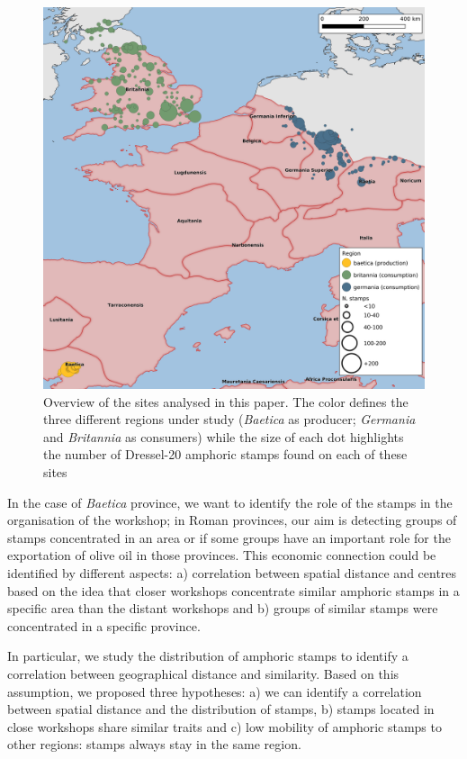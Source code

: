 \documentclass[review]{elsarticle}
\begin{document}
\begin{figure}[htp]
	\centering
\includegraphics[width=\linewidth]{figs/general_map}
\caption{Overview of the sites analysed in this paper. The color defines the three different regions under study (\textit{Baetica} as producer; \textit{Germania} and \textit{Britannia} as consumers) while the size of each dot highlights the number of Dressel-20 amphoric stamps found on each of these sites}

\label{general}
\end{figure} 
        
In the case of \textit{Baetica} province, we want to identify the role of the stamps in the organisation of the workshop; in Roman provinces, our aim is detecting groups of stamps concentrated in an area or if some groups have an important role for the exportation of olive oil in those provinces. This economic connection could be identified by different aspects: a) correlation between spatial distance and centres based on the idea that closer workshops concentrate similar amphoric stamps in a specific area than the distant workshops and b) groups of similar stamps were concentrated in a specific province. 

In particular, we study the distribution of amphoric stamps to identify a correlation between geographical distance and similarity. Based on this assumption, we proposed three hypotheses: a) we can identify a correlation between spatial distance and the distribution of stamps, b) stamps located in close workshops share similar traits and c) low mobility of amphoric stamps to other regions: stamps always stay in the same region. 
\end{document}
